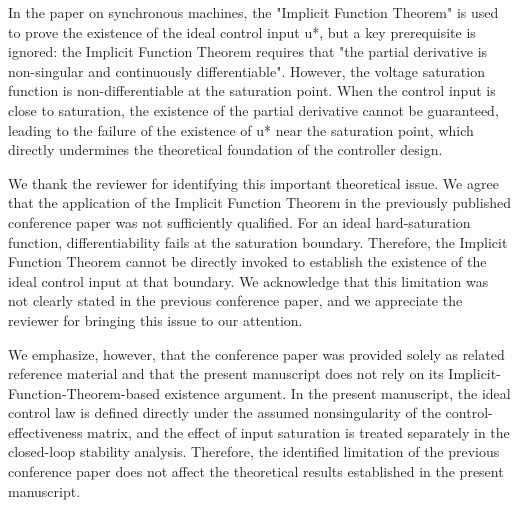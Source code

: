\documentclass[12pt,english]{reviewresponse}
\begin{document}
% 
\begin{revcomment}[2][1]{}
	In the paper on synchronous machines, the "Implicit Function Theorem" is used to prove the existence of the ideal control input u*, but a key prerequisite is ignored: the Implicit Function Theorem requires that "the partial derivative is non-singular and continuously differentiable". However, the voltage saturation function is non-differentiable at the saturation point. When the control input is close to saturation, the existence of the partial derivative cannot be guaranteed, leading to the failure of the existence of u* near the saturation point, which directly undermines the theoretical foundation of the controller design.
\end{revcomment}

\begin{revresponse}
  We thank the reviewer for identifying this important theoretical issue. 
  We agree that the application of the Implicit Function Theorem in the previously published conference paper was not sufficiently qualified. 
  For an ideal hard-saturation function, differentiability fails at the saturation boundary. 
  Therefore, the Implicit Function Theorem cannot be directly invoked to establish the existence of the ideal control input at that boundary.
  We acknowledge that this limitation was not clearly stated in the previous conference paper, and we appreciate the reviewer for bringing this issue to our attention.

  \bigskip

  We emphasize, however, that the conference paper was provided solely as related reference material and that the present manuscript does not rely on its Implicit-Function-Theorem-based existence argument. 
  In the present manuscript, the ideal control law is defined directly under the assumed nonsingularity of the control-effectiveness matrix, and the effect of input saturation is treated separately in the closed-loop stability analysis. 
  Therefore, the identified limitation of the previous conference paper does not affect the theoretical results established in the present manuscript.

\end{revresponse}
\end{document}
